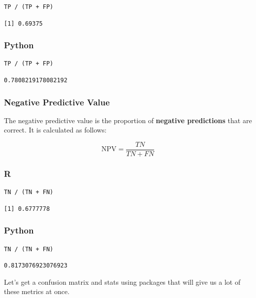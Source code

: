 \documentclass[
  letterpaper,
]{krantz}
\begin{document}
\begin{verbatim}
TP / (TP + FP)
\end{verbatim}

\begin{verbatim}
[1] 0.69375
\end{verbatim}

\subsubsection{Python}

\begin{verbatim}
TP / (TP + FP)
\end{verbatim}

\begin{verbatim}
0.7808219178082192
\end{verbatim}

\subsubsection{Negative Predictive Value}\label{sec-knowing-metrics-npv}

The negative predictive value is the proportion of \textbf{negative
predictions} that are correct. It is calculated as follows:

\[\text{NPV} = \frac{TN}{TN + FN}\]

\subsubsection{R}

\begin{verbatim}
TN / (TN + FN)
\end{verbatim}

\begin{verbatim}
[1] 0.6777778
\end{verbatim}

\subsubsection{Python}

\begin{verbatim}
TN / (TN + FN)
\end{verbatim}

\begin{verbatim}
0.8173076923076923
\end{verbatim}

Let's get a confusion matrix and stats using packages that will give us
a lot of these metrics at once.
\end{document}
